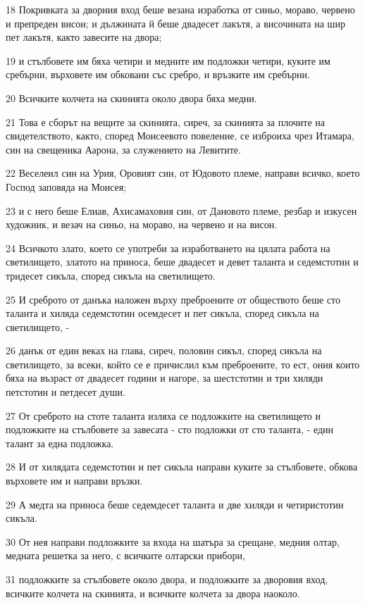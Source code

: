 \par 18 Покривката за дворния вход беше везана изработка от синьо, мораво, червено и препреден висон; и дължината й беше двадесет лакътя, а височината на шир пет лакътя, както завесите на двора;
\par 19 и стълбовете им бяха четири и медните им подложки четири, куките им сребърни, върховете им обковани със сребро, и връзките им сребърни.
\par 20 Всичките колчета на скинията около двора бяха медни.
\par 21 Това е сборът на вещите за скинията, сиреч, за скинията за плочите на свидетелството, както, според Моисеевото повеление, се изброиха чрез Итамара, син на свещеника Аарона, за служението на Левитите.
\par 22 Веселеил син на Урия, Оровият син, от Юдовото племе, направи всичко, което Господ заповяда на Моисея;
\par 23 и с него беше Елиав, Ахисамаховия син, от Дановото племе, резбар и изкусен художник, и везач на синьо, на мораво, на червено и на висон.
\par 24 Всичкото злато, което се употреби за изработването на цялата работа на светилището, златото на приноса, беше двадесет и девет таланта и седемстотин и тридесет сикъла, според сикъла на светилището.
\par 25 И среброто от данъка наложен върху преброените от обществото беше сто таланта и хиляда седемстотин осемдесет и пет сикъла, според сикъла на светилището, -
\par 26 данък от един веках на глава, сиреч, половин сикъл, според сикъла на светилището, за всеки, който се е причислил към преброените, то ест, ония които бяха на възраст от двадесет години и нагоре, за шестстотин и три хиляди петстотин и петдесет души.
\par 27 От среброто на стоте таланта изляха се подложките на светилището и подложките на стълбовете за завесата - сто подложки от сто таланта, - един талант за една подложка.
\par 28 И от хилядата седемстотин и пет сикъла направи куките за стълбовете, обкова върховете им и направи връзки.
\par 29 А медта на приноса беше седемдесет таланта и две хиляди и четиристотин сикъла.
\par 30 От нея направи подложките за входа на шатъра за срещане, медния олтар, медната решетка за него, с всичките олтарски прибори,
\par 31 подложките за стълбовете около двора, и подложките за дворовия вход, всичките колчета на скинията, и всичките колчета за двора наоколо.


